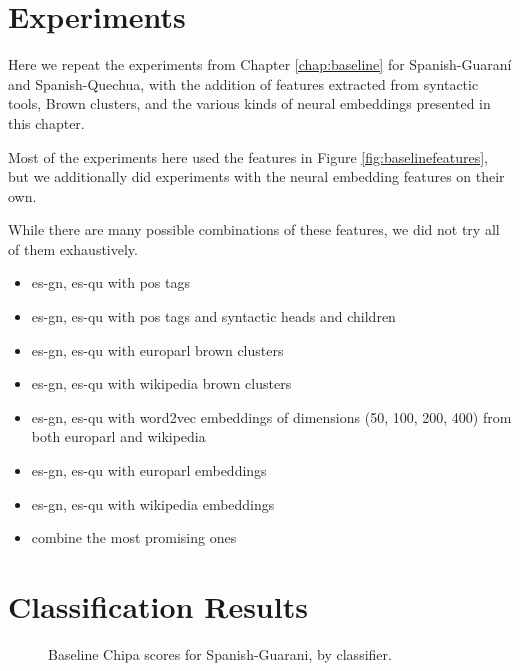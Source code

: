 \section{Experiments}
\label{sec:monolingual-experiments}
Here we repeat the experiments from Chapter \ref{chap:baseline} for
Spanish-Guaraní and Spanish-Quechua, with the addition of features extracted
from syntactic tools, Brown clusters, and the various kinds of neural
embeddings presented in this chapter.

Most of the experiments here used the features in Figure
\ref{fig:baselinefeatures}, but we additionally did experiments with the neural
embedding features on their own.

While there are many possible combinations of these features, we did not try
all of them exhaustively.

\begin{itemize}
  \item es-gn, es-qu with pos tags
  \item es-gn, es-qu with pos tags and syntactic heads and children
\end{itemize}

\begin{itemize}
  \item es-gn, es-qu with europarl brown clusters
  \item es-gn, es-qu with wikipedia brown clusters
  \item es-gn, es-qu with word2vec embeddings of dimensions (50, 100, 200, 400)
  from both europarl and wikipedia
\end{itemize}

\begin{itemize}
  \item es-gn, es-qu with europarl embeddings
  \item es-gn, es-qu with wikipedia embeddings
\end{itemize}

\begin{itemize}
  \item combine the most promising ones
\end{itemize}

\section{Classification Results} 

\begin{figure}
  \caption{Baseline Chipa scores for Spanish-Guarani, by classifier.}
  \label{fig:esgnresults:monolingual}
\end{figure}

